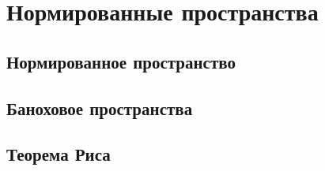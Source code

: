 \chapter{Нормированные пространства}
\section{Нормированное пространство}
\section{Баноховое пространства}
\section{Теорема Риса}